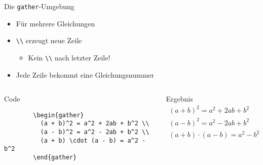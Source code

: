 \begin{frame}[fragile]{Die \texttt{gather}-Umgebung}
  \begin{itemize}
    \item Für mehrere Gleichungen
    \item \verb+\\+ erzeugt neue Zeile
      \begin{itemize}
        \item Kein \verb+\\+ nach letzter Zeile!
      \end{itemize}
    \item Jede Zeile bekommt eine Gleichungsnummer
  \end{itemize}
  \begin{columns}[onlytextwidth, t]
    \begin{column}{0.53\textwidth}
      \begin{block}{Code}
        \begin{lstlisting}
        \begin{gather}
          (a + b)^2 = a^2 + 2ab + b^2 \\
          (a - b)^2 = a^2 - 2ab + b^2 \\
          (a + b) \cdot (a - b) = a^2 - b^2
        \end{gather}
        \end{lstlisting}
      \end{block}
    \end{column}
    \begin{column}{0.43\textwidth}
      \begin{block}{Ergebnis}
        \begin{gather}
          (a + b)^2 = a^2 + 2ab + b^2 \\
          (a - b)^2 = a^2 - 2ab + b^2 \\
          (a + b) \cdot (a - b) = a^2 - b^2
        \end{gather}
      \end{block}
    \end{column}
  \end{columns}
\end{frame}


